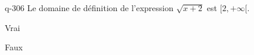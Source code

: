 \begin{truefalse}{q-306}
Le domaine de définition de l'expression $\sqrt{x+2}$ est $[2,+\infty[$.
\item Vrai
\item* Faux
\end{truefalse}

